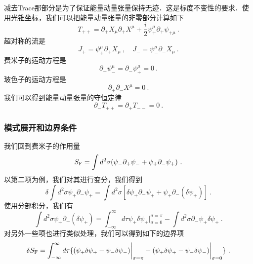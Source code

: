 减去Trace那部分是为了保证能量动量张量保持无迹．这是标度不变性的要求．使用光锥坐标，我们可以把能量动量张量的非零部分计算如下
\begin{equation}
T_{++} = \partial_+X_\mu\partial_+X^\mu + \frac{i}{2} \psi^\mu_+ \partial_+ \psi_{+\mu}~.
\end{equation}
超对称的流是
\begin{equation}
J_+ = \psi^\mu_+ \partial_+ X_\mu~, \quad J_- = \psi^\mu_- \partial_- X_\mu ~.
\end{equation}
费米子的运动方程是
\begin{equation}
\partial_+\psi^\mu_- = \partial_- \psi^\mu_+ = 0~.
\end{equation}
玻色子的运动方程是
\begin{equation}
\partial_+\partial_- X^\mu = 0~.
\end{equation}
我们可以得到能量动量张量的守恒定律
\begin{equation}
\partial_- T_{++} = \partial_+ T_{--} = 0~.
\end{equation}

\subsubsection{模式展开和边界条件}
我们回到费米子的作用量
\begin{equation}
S_{\rm F} = \int d^2\sigma (\psi_-\partial_+\psi_-+\psi_+\partial_-\psi_+)~.
\end{equation}
以第二项为例，我们对其进行变分，我们得到
\begin{equation}
\delta \int d^2\sigma\psi_+ \partial_- \psi_+ = \int d^2\sigma [\delta\psi_+\partial_-\psi_+ + \psi_+ \partial_- (\delta\psi_+)]~.
\end{equation}
使用分部积分，我们有
\begin{equation}
\int d^2\sigma \psi_+ \partial_- (\delta\psi_+) = \int_{-\infty}^{\infty} d \tau \psi_+ \delta\psi_+ \bigg|_{\sigma = 0}^{\sigma = \pi} - \int d^2\sigma \partial_-\psi_+\delta\psi_+~.
\end{equation}
对另外一些项也进行类似处理，我们可以得到如下的边界项
\begin{equation}
\delta S_{\rm F} = \int_{-\infty}^{\infty} d\tau \{ (\psi_+\delta \psi_+ - \psi_-\delta \psi_-) \bigg|_{\sigma = \pi} - (\psi_+\delta\psi_+ - \psi_-\delta\psi_-) \bigg|_{\sigma = 0} \}~.
\end{equation}

